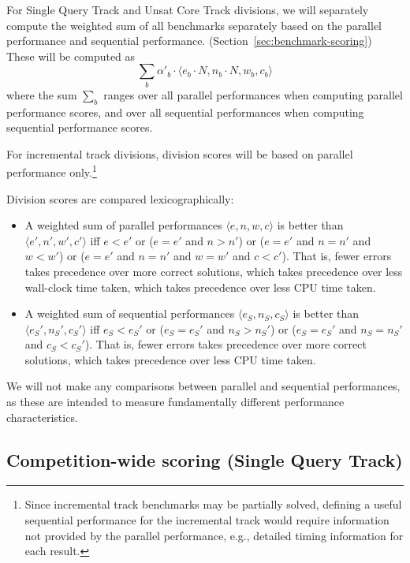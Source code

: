 \documentclass[12pt]{article}
\newcommand{\main}{Single Query\xspace}
\newcommand{\ucore}{Unsat Core\xspace}
\begin{document}
For \main Track and \ucore Track divisions, we will separately
compute the weighted sum of all benchmarks separately based on the
parallel performance and sequential performance.
(Section~\ref{sec:benchmark-scoring})
%
These will be computed as
$$\sum_b \alpha'_b \cdot \langle e_b \cdot N, n_b \cdot N, w_b, c_b\rangle$$
%
where the sum $\sum_b$ ranges over all parallel performances when
computing parallel performance scores, and over all sequential
performances when computing sequential performance scores.
\iffalse
benchmarks in the division to assess parallel performance, and the
weighted sum of all sequential performances (Section~\ref{sec:sequential})
to assess sequential performance.
\fi
For incremental track divisions,
division scores will be based on parallel performance only.\footnote{Since
  incremental track benchmarks may be partially solved, defining a
  useful sequential performance for the incremental track would require
  information not provided by the parallel performance, e.g., detailed timing
  information for each result.}

Division scores are compared lexicographically:
\begin{itemize}
\item A weighted sum of parallel performances $\langle e, n, w, c\rangle$ is
  better than $\langle e', n', w', c'\rangle$ iff $e < e'$ or ($e =
  e'$ and $n > n'$) or ($e = e'$ and $n = n'$ and $w < w'$) or ($e =
  e'$ and $n = n'$ and $w = w'$ and $c < c'$).  That is, fewer errors
  takes precedence over more correct solutions, which takes precedence
  over less wall-clock time taken, which takes precedence over less
  CPU time taken.
\item A weighted sum of sequential performances $\langle e_S, n_S,
  c_S\rangle$ is better than $\langle e_S', n_S', c_S'\rangle$ iff
  $e_S < e_S'$ or ($e_S = e_S'$ and $n_S > n_S'$) or ($e_S = e_S'$ and
  $n_S = n_S'$ and $c_S < c_S'$).  That is, fewer errors takes
  precedence over more correct solutions, which takes precedence over
  less CPU time taken.
\end{itemize}
%
We will not make any comparisons between parallel and sequential
performances, as these are intended to measure fundamentally different
performance characteristics.

\subsection{Competition-wide scoring (\main Track)}
\label{sec:competition-wide}
\end{document}
